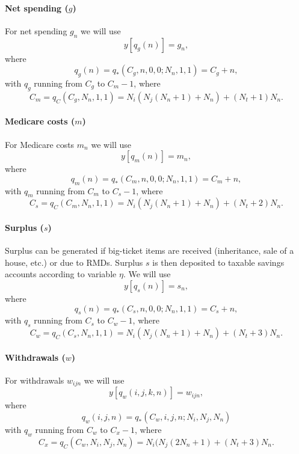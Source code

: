 \documentclass{report}[fleqn,11pt]
\begin{document}
\paragraph*{Net spending (\boldmath$g$)}
For net spending $g_{n}$ we will use
\begin{equation}
	y[q_g(n)] = g_{n},
\end{equation}
where
\begin{equation}
	q_g(n) = q_*(C_g, n, 0, 0; N_n, 1, 1) = C_g + n,
\end{equation}
with $q_g$ running from $C_g$ to $C_m - 1$, where
\[
	C_m = q_C(C_g, N_n, 1, 1) = N_i(N_j(N_n+1) + N_n) + (N_t + 1) N_n.
\]

\paragraph*{Medicare costs (\boldmath$m$)}
For Medicare costs $m_{n}$ we will use
\begin{equation}
	y[q_m(n)] = m_{n},
\end{equation}
where
\begin{equation}
	q_m(n) = q_*(C_m, n, 0, 0; N_n, 1, 1) = C_m + n,
\end{equation}
with $q_m$ running from $C_m$ to $C_s - 1$, where
\[
	C_s = q_C(C_m, N_n, 1, 1) = N_i(N_j(N_n+1) + N_n) + (N_t + 2) N_n.
\]

\paragraph*{Surplus (\boldmath$s$)}
Surplus can be generated if big-ticket items are received (inheritance, sale of a house, etc.)
or due to RMDs. Surplus $s$ is then deposited to taxable savings accounts according
to variable $\eta$. We will use
\begin{equation}
	y[q_s(n)] = s_{n},
\end{equation}
where
\begin{equation}
	q_s(n) = q_*(C_s, n, 0, 0; N_n, 1, 1) = C_s + n,
\end{equation}
with $q_s$ running from $C_s$ to $C_w - 1$, where
\[
	C_w = q_C(C_s, N_n, 1, 1) = N_i(N_j(N_n+1) + N_n) + (N_t + 3) N_n.
\]

\paragraph*{Withdrawals (\boldmath$w$)}
For withdrawals $w_{ijn}$ we will use
\begin{equation}
	y[q_w(i, j, k, n)] = w_{i j n},
\end{equation}
where
\begin{equation}
	q_w(i, j, n) = q_*(C_w, i, j, n; N_i, N_j, N_n)
\end{equation}
with $q_w$ running from $C_w$ to $C_x - 1$, where
\[
	C_x = q_C(C_w, N_i, N_j, N_n) = N_i(N_j(2N_n + 1) + (N_t + 3) N_n.
\]
\end{document}

